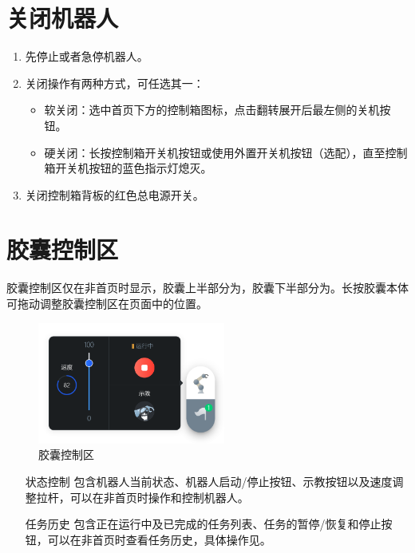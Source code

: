 \section{关闭机器人}
\begin{enumerate}
	\item 先停止或者急停机器人。 
	\item 关闭操作有两种方式，可任选其一： 
	\begin{itemize}
	\item 软关闭：选中\LM 首页下方的控制箱图标，点击翻转展开后最左侧的关机按钮。
	\item 硬关闭：长按控制箱开关机按钮或使用外置开关机按钮（选配），直至控制箱开关机按钮的蓝色指示灯熄灭。 
		\end{itemize}
	\item 关闭控制箱背板的红色总电源开关。 
\end{enumerate}


\section{胶囊控制区}
胶囊控制区仅在非首页时显示，胶囊上半部分为，胶囊下半部分为。长按胶囊本体可拖动调整胶囊控制区在页面中的位置。

\begin{figure}[hb]
	\centering
	\includegraphics[height=4cm]{screen/2-18.png}
	\caption{胶囊控制区}
	\label{fig:胶囊控制区}
\end{figure}

\begin{itemize}[leftmargin=4.5em]
	\item [状态控制] 包含机器人当前状态、机器人启动/停止按钮、示教按钮以及速度调整拉杆，可以在非首页时操作和控制机器人。
	\item [任务历史] 包含正在运行中及已完成的任务列表、任务的暂停/恢复和停止按钮，可以在非首页时查看任务历史，具体操作见。
\end{itemize}
